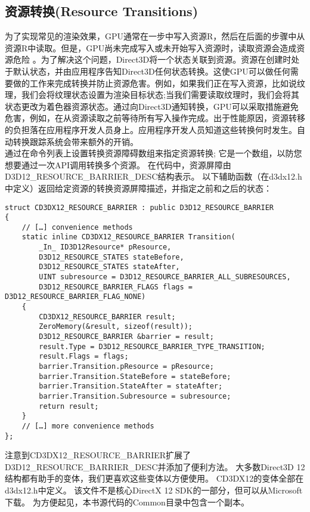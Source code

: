 \subsection{资源转换(Resource Transitions)}
\begin{flushleft}
为了实现常见的渲染效果，GPU通常在一步中写入资源R，然后在后面的步骤中从资源R中读取。但是，GPU尚未完成写入或未开始写入资源时，读取资源会造成资源危险 。为了解决这个问题，Direct3D将一个状态关联到资源。资源在创建时处于默认状态，并由应用程序告知Direct3D任何状态转换。这使GPU可以做任何需要做的工作来完成转换并防止资源危害。例如，如果我们正在写入资源，比如说纹理，我们会将纹理状态设置为渲染目标状态;当我们需要读取纹理时，我们会将其状态更改为着色器资源状态。通过向Direct3D通知转换，GPU可以采取措施避免危害，例如，在从资源读取之前等待所有写入操作完成。出于性能原因，资源转移的负担落在应用程序开发人员身上。应用程序开发人员知道这些转换何时发生。自动转换跟踪系统会带来额外的开销。\\
通过在命令列表上设置转换资源障碍数组来指定资源转换; 它是一个数组，以防您想要通过一次API调用转换多个资源。 在代码中，资源屏障由D3D12\_RESOURCE\_BARRIER\_DESC结构表示。 以下辅助函数（在d3dx12.h中定义）返回给定资源的转换资源屏障描述，并指定之前和之后的状态：\\
\begin{lstlisting}
struct CD3DX12_RESOURCE_BARRIER : public D3D12_RESOURCE_BARRIER
{
    // […] convenience methods
    static inline CD3DX12_RESOURCE_BARRIER Transition(
        _In_ ID3D12Resource* pResource,
        D3D12_RESOURCE_STATES stateBefore,
        D3D12_RESOURCE_STATES stateAfter,
        UINT subresource = D3D12_RESOURCE_BARRIER_ALL_SUBRESOURCES,
        D3D12_RESOURCE_BARRIER_FLAGS flags = D3D12_RESOURCE_BARRIER_FLAG_NONE)
    {
        CD3DX12_RESOURCE_BARRIER result;
        ZeroMemory(&result, sizeof(result));
        D3D12_RESOURCE_BARRIER &barrier = result;
        result.Type = D3D12_RESOURCE_BARRIER_TYPE_TRANSITION;
        result.Flags = flags;
        barrier.Transition.pResource = pResource;
        barrier.Transition.StateBefore = stateBefore;
        barrier.Transition.StateAfter = stateAfter;
        barrier.Transition.Subresource = subresource;
        return result;
    }
    // […] more convenience methods
};
\end{lstlisting}
注意到CD3DX12\_RESOURCE\_BARRIER扩展了D3D12\_RESOURCE\_BARRIER\_DESC并添加了便利方法。 大多数Direct3D 12结构都有助手的变体，我们更喜欢这些变体以方便使用。 CD3DX12的变体全部在d3dx12.h中定义。 该文件不是核心DirectX 12 SDK的一部分，但可以从Microsoft下载。 为方便起见，本书源代码的Common目录中包含一个副本。\\

\end{flushleft}
